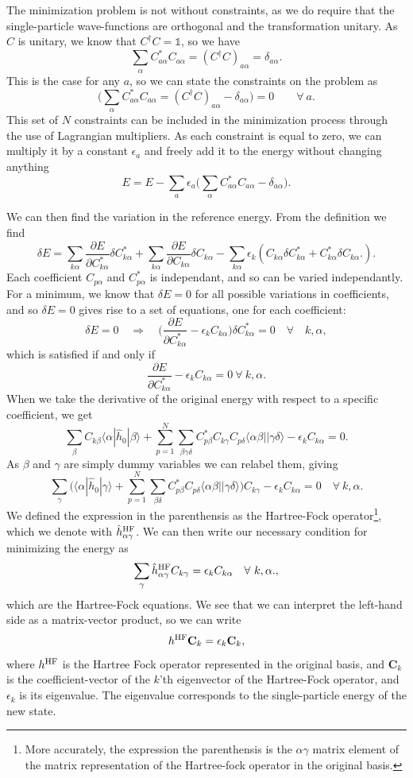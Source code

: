 \documentclass[a4paper, 11pt, notitlepage, english]{article}
\newcommand{\braket}[2]{\langle #1 | #2 \rangle}
\newcommand{\op}[1]{\hat{#1}}
\newcommand{\braopket}[3]{\langle #1 | {#2} | #3 \rangle}
\newcommand{\eps}{\epsilon}
\newcommand{\p}{\partial}
\begin{document}
The minimization problem is not without constraints, as we do require that the single-particle wave-functions are orthogonal and the transformation unitary. As $C$ is unitary, we know that
$C^\dagger C = \mathbb{1}$, so we have
$$\sum_\alpha C_{a \alpha}^* C_{a \alpha} = (C^\dagger C)_{a \alpha} = \delta_{a \alpha}.$$
This is the case for any $a$, so we can state the constraints on the problem as
$$\bigg(\sum_\alpha C_{a\alpha}^* C_{a\alpha} = (C^\dagger C)_{a\alpha} - \delta_{a\alpha}\bigg) = 0 \qquad \forall \ a.$$
This set of $N$ constraints can be included in the minimization process through the use of Lagrangian multipliers. As each constraint is equal to zero, we can multiply it by a constant $\eps_a$ and freely add it to the energy without changing anything
$$E = E - \sum_a \eps_a \bigg(\sum_\alpha C_{a \alpha}^* C_{a \alpha} - \delta_{a\alpha}\bigg).$$

We can then find the variation in the reference energy. From the definition we find
$$\delta E = \sum_{k\alpha}\frac{\p E}{\p C_{k\alpha}^*} \delta C_{k\alpha}^* + \sum_{k\alpha} \frac{\p E}{\p C_{k\alpha}}\delta C_{k\alpha} - \sum_{k\alpha}\eps_k (C_{k\alpha} \delta C_{k\alpha}^* + C_{k\alpha}^*\delta C_{k\alpha}.) .$$
Each coefficient $C_{p\alpha}$ and $C_{p\alpha}^*$  is independant, and so can be varied independantly. For a minimum, we know that $\delta E = 0$ for all possible variations in coefficients, and so $\delta E = 0$ gives rise to a set of equations, one for each coefficient:
$$\delta E = 0 \quad \Rightarrow \quad \bigg(\frac{\p E}{\p C_{k\alpha}^*} - \eps_k C_{k\alpha} \bigg)\delta C_{k\alpha}^* = 0 \quad \forall \quad k, \alpha,$$
which is satisfied if and only if
$$\frac{\p E}{\p C_{k\alpha}^*} - \eps_k C_{k\alpha} = 0 \ \forall\ k, \alpha.$$
When we take the derivative of the original energy with respect to a specific coefficient, we get
$$\sum_{\beta} C_{k \beta}\braopket{\alpha}{\op{h}_0}{\beta} + \sum_{p=1}^N \sum_{\beta\gamma\delta} C_{p\beta}^* C_{k \gamma} C_{p \delta} \braket{\alpha\beta|}{\gamma\delta} - \eps_k C_{k\alpha} = 0.$$
As $\beta$ and $\gamma$ are simply dummy variables we can relabel them, giving
$$\sum_\gamma \bigg(\braopket{\alpha}{\op{h}_0}{\gamma} + \sum_{p=1}^N\sum_{\beta\delta} C_{p\beta}^* C_{p \delta} \braket{\alpha\beta|}{\gamma\delta}\bigg)C_{k \gamma} - \eps_k C_{k\alpha} = 0 \quad \forall \ k, \alpha.$$
We defined the expression in the parenthensis as the Hartree-Fock operator\footnote{More accurately, the expression the parenthensis is the $\alpha\gamma$ matrix element of the matrix representation of the Hartree-fock operator in the original basis.}, which we denote with $\op{h}_{\alpha\gamma}^{\rm HF}$. We can then write our necessary condition for minimizing the energy as
$$\sum_\gamma \op{h}_{\alpha\gamma}^{\rm HF}C_{k\gamma} = \eps_{k} C_{k\alpha} \quad \forall \ k, \alpha.,$$
which are the Hartree-Fock equations. We see that we can interpret the left-hand side as a matrix-vector product, so we can write
$$h^{\rm HF} \mathbf{C}_k = \eps_k \mathbf{C}_k,$$
where $h^{\rm HF}$ is the Hartree Fock operator represented in the original basis, and $\mathbf{C}_k$ is the coefficient-vector of the $k$'th eigenvector of the Hartree-Fock operator, and $\eps_k$ is its eigenvalue. The eigenvalue corresponds to the single-particle energy of the new state.
\end{document}

